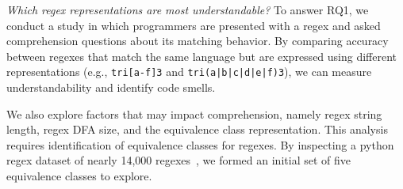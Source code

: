 
%
%

 {\em Which regex representations are most understandable?}
To answer RQ1, we conduct a study in which programmers are presented with a regex and asked comprehension questions about its matching behavior. By comparing accuracy between  regexes that match the same language but are expressed using different representations (e.g., \verb!tri[a-f]3! and \verb!tri(a|b|c|d|e|f)3!), we can measure understandability and identify code smells.

We also explore factors that may impact comprehension, namely regex string length, regex DFA size, and the equivalence class representation.
This analysis requires identification of equivalence classes for regexes. By inspecting a python regex dataset of nearly 14,000 regexes~\cite{chapman2016}, we formed an initial set of five equivalence classes to explore. \\

